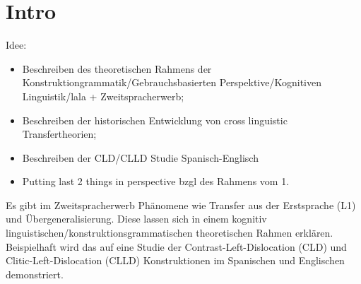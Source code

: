 \section{Intro}

\begin{comment}
* ca 3/4 Seiten
* Untersuchungsgegenstand
* Erkenntnisinteresse
* Forschungsstand
* Vorgehensweise: also Section 2 macht blabla, Section 3 blablup, ....
* Ergebnisse können/sollen angedeuten werden
\end{comment}

Idee:
\begin{itemize}
    \item Beschreiben des theoretischen Rahmens der Konstruktiongrammatik/Gebrauchsbasierten Perspektive/Kognitiven Linguistik/lala + Zweitspracherwerb;
    \item Beschreiben der historischen Entwicklung von cross linguistic Transfertheorien;
    \item Beschreiben der CLD/CLLD Studie Spanisch-Englisch
    \item Putting last 2 things in perspective bzgl des Rahmens vom 1.
\end{itemize}

Es gibt im Zweitspracherwerb Phänomene wie Transfer aus der Erstsprache (L1) und Übergeneralisierung.
Diese lassen sich in einem kognitiv linguistischen/konstruktionsgrammatischen theoretischen Rahmen erklären.
Beispielhaft wird das auf eine Studie der Contrast-Left-Dislocation (CLD) und Clitic-Left-Dislocation (CLLD) Konstruktionen im Spanischen und Englischen demonstriert.
